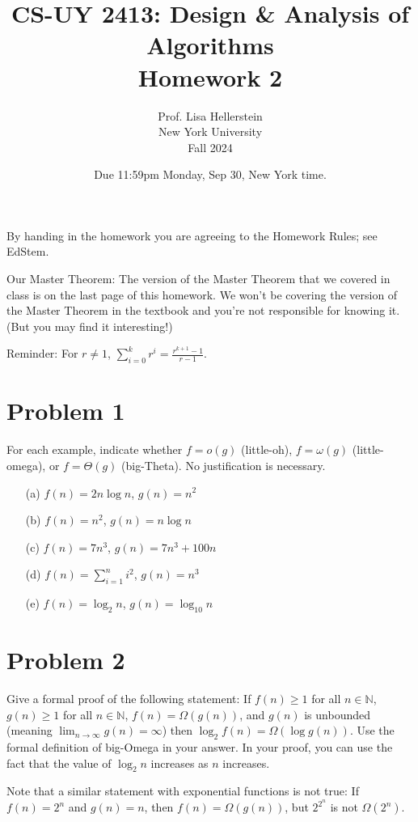 \documentclass{article}
\title{CS-UY 2413: Design \& Analysis of Algorithms \\ Homework 2}
\author{Prof. Lisa Hellerstein \\ New York University \\ Fall 2024}
\date{Due 11:59pm Monday, Sep 30, New York time.}
\begin{document}
\maketitle

\noindent By handing in the homework you are agreeing to the Homework Rules; see EdStem.

\noindent Our Master Theorem: The version of the Master Theorem that we covered in class is on the last page of this homework. We won’t be covering the version of the Master Theorem in the textbook and you’re not responsible for knowing it. (But you may find it interesting!)

\noindent Reminder: For $r \neq 1$, $\sum_{i=0}^{k} r^i = \frac{r^{k+1} - 1}{r - 1}$.

\section*{Problem 1}
For each example, indicate whether $f = o(g)$ (little-oh), $f = \omega(g)$ (little-omega), or $f = \Theta(g)$ (big-Theta). No justification is necessary.

\begin{enumerate}
    \item[(a)] $f(n) = 2n \log n$, $g(n) = n^2$
    \item[(b)] $f(n) = n^2$, $g(n) = n \log n$
    \item[(c)] $f(n) = 7n^3$, $g(n) = 7n^3 + 100n$
    \item[(d)] $f(n) = \sum_{i=1}^n i^2$, $g(n) = n^3$
    \item[(e)] $f(n) = \log_2 n$, $g(n) = \log_{10} n$
\end{enumerate}

\section*{Problem 2}
Give a formal proof of the following statement: If $f(n) \ge 1$ for all $n \in \mathbb{N}$, $g(n) \ge 1$ for all $n \in \mathbb{N}$, $f(n) = \Omega(g(n))$, and $g(n)$ is unbounded (meaning $\lim_{n \to \infty} g(n) = \infty$) then $\log_2 f(n) = \Omega(\log g(n))$. Use the formal definition of big-Omega in your answer. In your proof, you can use the fact that the value of $\log_2 n$ increases as $n$ increases.

Note that a similar statement with exponential functions is not true: If $f(n) = 2^n$ and $g(n) = n$, then $f(n) = \Omega(g(n))$, but $2^{2^n}$ is not $\Omega(2^n)$.
\end{document}
